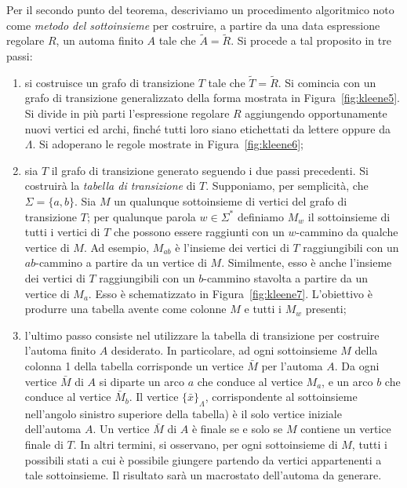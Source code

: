 \documentclass[10pt]{\classname}
\theoremstyle{definition}
\theoremstyle{definition}
\theoremstyle{definition}
\theoremstyle{definition}
\begin{document}
Per il secondo punto del teorema, descriviamo un procedimento algoritmico noto come \emph{metodo del sottoinsieme} per costruire, a partire da una data espressione regolare $R$, un automa finito $A$ tale che $\tilde A = \tilde R$. Si procede a tal proposito in tre passi:
\begin{enumerate}
    \item si costruisce un grafo di transizione $T$ tale che $\tilde T = \tilde R$. Si comincia con un grafo di transizione generalizzato della forma mostrata in Figura~\ref{fig:kleene5}. Si divide in più parti l'espressione regolare $R$ aggiungendo opportunamente nuovi vertici ed archi, finché tutti loro siano etichettati da lettere oppure da $\Lambda$. Si adoperano le regole mostrate in Figura~\ref{fig:kleene6};
    \item sia $T$ il grafo di transizione generato seguendo i due passi precedenti. Si costruirà la \emph{tabella di transizione} di $T$. Supponiamo, per semplicità, che $\Sigma = \{a,b\}$. Sia $M$ un qualunque sottoinsieme di vertici del grafo di transizione $T$; per qualunque parola $w \in \Sigma^*$ definiamo $M_w$ il sottoinsieme di tutti i vertici di $T$ che possono essere raggiunti con un $w$-cammino da qualche vertice di $M$. Ad esempio, $M_{ab}$ è l'insieme dei vertici di $T$ raggiungibili con un $ab$-cammino a partire da un vertice di $M$. Similmente, esso è anche l'insieme dei vertici di $T$ raggiungibili con un $b$-cammino stavolta a partire da un vertice di $M_a$. Esso è schematizzato in Figura~\ref{fig:kleene7}. L'obiettivo è produrre una tabella avente come colonne $M$ e tutti i $M_w$ presenti;
    \item l'ultimo passo consiste nel utilizzare la tabella di transizione per costruire l'automa finito $A$ desiderato. In particolare, ad ogni sottoinsieme $M$ della colonna 1 della tabella corrisponde un vertice $\bar M$ per l'automa $A$. Da ogni vertice $\bar M$ di $A$ si diparte un arco $a$ che conduce al vertice $M_a$, e un arco $b$ che conduce al vertice $\bar M_b$. Il vertice $\{\bar x\}_\Lambda$, corrispondente al sottoinsieme nell'angolo sinistro superiore della tabella) è il solo vertice iniziale dell'automa $A$. Un vertice $\bar M$ di $A$ è finale se e solo se $M$ contiene un vertice finale di $T$. In altri termini, si osservano, per ogni sottoinsieme di $M$, tutti i possibili stati a cui è possibile giungere partendo da vertici appartenenti a tale sottoinsieme. Il risultato sarà un macrostato dell'automa da generare.
\end{enumerate}
\end{document}
